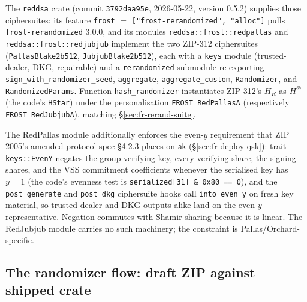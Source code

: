 \documentclass[11pt,a4paper]{article}
\theoremstyle{definition}
\newcommand{\aksym}{\ensuremath{\mathsf{ak}}}
\begin{document}
The \texttt{reddsa} crate (commit \texttt{3792daa95e}, 2026-05-22, version
0.5.2) supplies those ciphersuites: its feature \texttt{frost} $=$
\texttt{["frost-rerandomized", "alloc"]} pulls
\texttt{frost-rerandomized} 3.0.0, and its modules
\texttt{reddsa::frost::redpallas} and \texttt{reddsa::frost::redjubjub}
implement the two ZIP-312 ciphersuites (\texttt{PallasBlake2b512},
\texttt{JubjubBlake2b512}), each with a \texttt{keys} module
(trusted-dealer, DKG, repairable) and a \texttt{rerandomized} submodule
re-exporting \texttt{sign\_with\_randomizer\_seed}, \texttt{aggregate},
\texttt{aggregate\_custom}, \texttt{Randomizer}, and
\texttt{RandomizedParams}. Function \texttt{hash\_randomizer} instantiates
ZIP 312's $H_R$ as $H^{\circledast}$ (the code's \texttt{HStar}) under
the personalisation \texttt{FROST\_RedPallasA} (respectively
\texttt{FROST\_RedJubjubA}), matching \S\ref{sec:fr-rerand-suite}.

The RedPallas module additionally enforces the even-$y$ requirement that
ZIP 2005's amended protocol-spec \S4.2.3 places on $\aksym$
(\S\ref{sec:fr-deploy-qsk}): trait \texttt{keys::EvenY} negates the group
verifying key, every verifying share, the signing shares, and the VSS
commitment coefficients whenever the serialised key has $\tilde{y} = 1$
(the code's evenness test is \texttt{serialized[31] \& 0x80 == 0}), and
the
\texttt{post\_generate} and \texttt{post\_dkg} ciphersuite hooks call
\texttt{into\_even\_y} on fresh key material, so trusted-dealer and DKG
outputs alike land on the even-$y$ representative. Negation commutes with
Shamir sharing because it is linear. The RedJubjub module carries no such
machinery; the constraint is Pallas/Orchard-specific.

\subsection{The randomizer flow: draft ZIP against shipped crate}
\label{sec:fr-deploy-rand}
\end{document}
